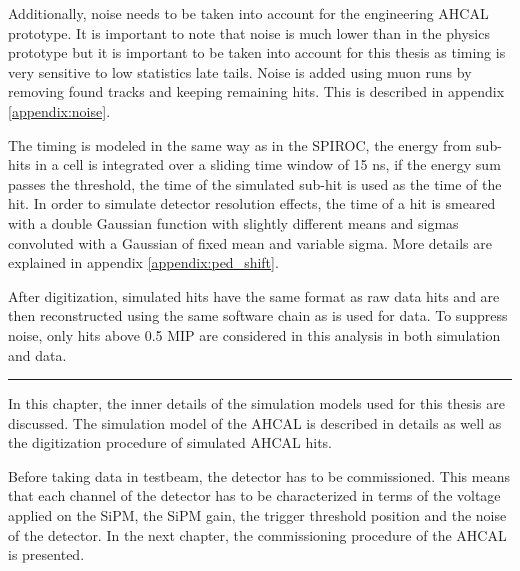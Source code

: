 Additionally, noise needs to be taken into account for the engineering AHCAL prototype. It is important to note that noise is much lower than in the physics prototype but it is important to be taken into account for this thesis as timing is very sensitive to low statistics late tails. Noise is added using muon runs by removing found tracks and keeping remaining hits. This is described in appendix \ref{appendix:noise}.

The timing is modeled in the same way as in the SPIROC, the energy from sub-hits in a cell is integrated over a sliding time window of 15 ns, if the energy sum passes the threshold, the time of the simulated sub-hit is used as the time of the hit. In order to simulate detector resolution effects, the time of a hit is smeared with a double Gaussian function with slightly different means and sigmas convoluted with a Gaussian of fixed mean and variable sigma. More details are explained in appendix \ref{appendix:ped_shift}.

After digitization, simulated hits have the same format as raw data hits and are then reconstructed using the same software chain as is used for data. To suppress noise, only hits above 0.5 MIP are considered in this analysis in both simulation and data.

\begin{center}
  \rule{0.5\textwidth}{.4pt}
\end{center}

In this chapter, the inner details of the simulation models used for this thesis are discussed. The simulation model of the AHCAL is described in details as well as the digitization procedure of simulated AHCAL hits.

Before taking data in testbeam, the detector has to be commissioned. This means that each channel of the detector has to be characterized in terms of the voltage applied on the SiPM, the SiPM gain, the trigger threshold position and the noise of the detector. In the next chapter, the commissioning procedure of the AHCAL is presented.
